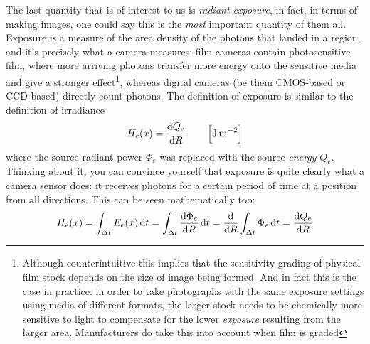 The last quantity that is of interest to us is \textsl{radiant \gls{exposure}},
in fact, in terms of making images, one could say this is the \emph{most} important
quantity of them all. Exposure is a measure of the area density of
the photons that landed in a region, and it's precisely what a camera measures:
film cameras contain photosensitive film, where more arriving photons transfer more
energy onto the sensitive media and give a stronger effect\footnote{
	Although counterintuitive this implies that the sensitivity grading of physical film
	stock depends on the size of image being formed. And in fact this is the case in practice:
	in order to take photographs with the same exposure settings using media of different
	formats, the larger stock needs to be chemically more sensitive to light to compensate
	for the lower \textsl{exposure} resulting from the larger area.
	Manufacturers do take this into account when film is graded
}, whereas digital cameras (be them \gls{CMOS}-based or \gls{CCD}-based) directly 
count photons. 
The definition of \gls{exposure} is similar to the definition of \gls{irradiance}
\begin{displaymath}
	H_e(x) = \frac{\d Q_e}{\d R} \qquad \left[\unit{\joule\per\square\meter}\right]
\end{displaymath}
where the source radiant power $\Phi_e$ was replaced with the source \emph{energy} $Q_e$.
Thinking about it, you can convince yourself that exposure is quite clearly what a camera
sensor does: it receives photons for a certain period of time at a position from all directions.
This can be seen mathematically too:
\begin{displaymath}
	H_e(x) = \int_{\Delta t} E_e(x) \d t 
	       = \int_{\Delta t} \frac{\d\Phi_e}{\d R} \d t
	       = \frac{\d}{\d R} \int_{\Delta t} \Phi_e \d t
	       = \frac{\d Q_e }{\d R} 
\end{displaymath}



